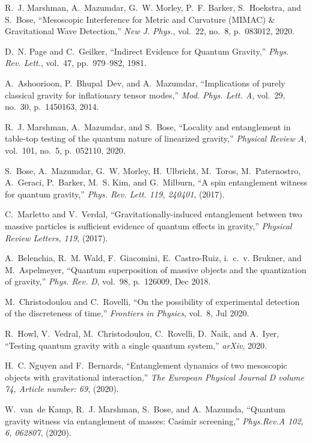 \documentclass[%
 reprint,
 superscriptaddress,
 amsmath,
 amssymb,
 aps,
 longbibliography
]{revtex4-2}
\begin{document}
\begin{thebibliography}{10}
R.~J. Marshman, A.~Mazumdar, G.~W. Morley, P.~F. Barker, S.~Hoekstra, and
  S.~Bose, ``{Mesoscopic Interference for Metric and Curvature (MIMAC) $\&$
  Gravitational Wave Detection},'' {\em New J. Phys.}, vol.~22, no.~8,
  p.~083012, 2020.

D.~N. Page and C.~Geilker, ``{Indirect Evidence for Quantum Gravity},'' {\em
  Phys. Rev. Lett.}, vol.~47, pp.~979--982, 1981.

A.~Ashoorioon, P.~Bhupal~Dev, and A.~Mazumdar, ``{Implications of purely
  classical gravity for inflationary tensor modes},'' {\em Mod. Phys. Lett. A},
  vol.~29, no.~30, p.~1450163, 2014.

R.~J. Marshman, A.~Mazumdar, and S.~Bose, ``Locality and entanglement in
  table-top testing of the quantum nature of linearized gravity,'' {\em
  Physical Review A}, vol.~101, no.~5, p.~052110, 2020.

S.~Bose, A.~Mazumdar, G.~W. Morley, H.~Ulbricht, M.~Toros, M.~Paternostro,
  A.~Geraci, P.~Barker, M.~S. Kim, and G.~Milburn, ``A spin entanglement
  witness for quantum gravity,'' {\em Phys. Rev. Lett. 119, 240401}, (2017).

C.~Marletto and V.~Verdal, ``Gravitationally-induced entanglement between two
  massive particles is sufficient evidence of quantum effects in gravity,''
  {\em Physical Review Letters, 119}, (2017).

A.~Belenchia, R.~M. Wald, F.~Giacomini, E.~Castro-Ruiz, i.~c.~v. Brukner, and
  M.~Aspelmeyer, ``Quantum superposition of massive objects and the
  quantization of gravity,'' {\em Phys. Rev. D}, vol.~98, p.~126009, Dec 2018.

M.~Christodoulou and C.~Rovelli, ``On the possibility of experimental detection
  of the discreteness of time,'' {\em Frontiers in Physics}, vol.~8, Jul 2020.

R.~Howl, V.~Vedral, M.~Christodoulou, C.~Rovelli, D.~Naik, and A.~Iyer,
  ``Testing quantum gravity with a single quantum system,'' {\em arXiv}, 2020.

H.~C. Nguyen and F.~Bernards, ``Entanglement dynamics of two mesoscopic objects
  with gravitational interaction,'' {\em The European Physical Journal D volume
  74, Article number: 69}, (2020).

W.~van~de Kamp, R.~J. Marshman, S.~Bose, and A.~Mazumda, ``Quantum gravity
  witness via entanglement of masses: Casimir screening,'' {\em Phys.Rev.A 102,
  6, 062807}, (2020).


\end{thebibliography}
\end{document}
